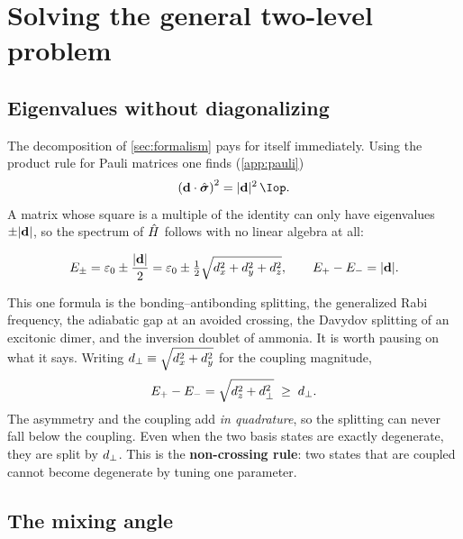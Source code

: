 \section{Solving the general two-level problem}
\label{sec:geometry}

\subsection{Eigenvalues without diagonalizing}

The decomposition of \cref{sec:formalism} pays for itself immediately. Using the
product rule for Pauli matrices one finds (\cref{app:pauli})
%
\begin{equation}
\left(\dvec\cdot\pauliv\right)^2 = |\dvec|^2\,\Iop .
\label{eq:dsquared}
\end{equation}
%
A matrix whose square is a multiple of the identity can only have eigenvalues
$\pm|\mathbf{d}|$, so the spectrum of $\hat{H}$ follows with no linear algebra at all:

\begin{keyresult}[Splitting]
\vspace{-0.35cm}
\begin{equation}
E_{\pm} = \varepsilon_0 \pm \frac{|\mathbf{d}|}{2}
        = \varepsilon_0 \pm \tfrac{1}{2}\sqrt{d_x^2+d_y^2+d_z^2},
\qquad
E_+ - E_- = |\mathbf{d}| .
\label{eq:eigenvalues}
\end{equation}
\end{keyresult}

\noindent
This one formula is the bonding--antibonding splitting, the generalized Rabi frequency,
the adiabatic gap at an avoided crossing, the Davydov splitting of an excitonic dimer,
and the inversion doublet of ammonia. It is worth pausing on what it says. Writing
$d_{\perp} \equiv \sqrt{d_x^2+d_y^2}$ for the coupling magnitude,
%
\begin{equation}
E_+ - E_- = \sqrt{d_z^2 + d_{\perp}^2} \;\geq\; d_{\perp} .
\label{eq:noncrossing}
\end{equation}
%
The asymmetry and the coupling add \emph{in quadrature}, so the splitting can never fall
below the coupling. Even when the two basis states are exactly degenerate, they are
split by $d_{\perp}$. This is the \textbf{non-crossing rule}: two states that are coupled
cannot become degenerate by tuning one parameter.

\subsection{The mixing angle}

